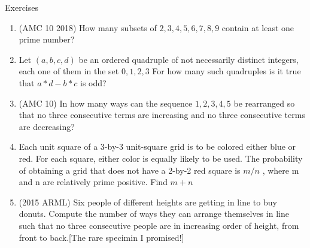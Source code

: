 \begin{xcb}{Exercises}
\begin{enumerate}
\begin{hint}
\end{hint}
\item(AMC 10 2018)  How many subsets of ${2, 3, 4, 5, 6, 7, 8, 9}$ contain at least one prime number?
\item {} Let $(a, b, c, d)$ be an ordered quadruple of not necessarily distinct integers, each one of them in the set $0, 1, 2, 3$ For how many such quadruples is it true that $a*d -b*c$ is odd?
\item (AMC 10)  In how many ways can the sequence $1, 2, 3, 4, 5$ be rearranged so that no three consecutive terms are increasing and no three consecutive terms are decreasing?
\item {} Each unit square of a 3-by-3 unit-square grid is to be colored either blue or red. For each square, either color is equally likely to be used. The probability of obtaining a grid that does not have a 2-by-2 red square is $m/n$ , where m and n are relatively prime positive. Find $m+n$
\begin{hint}
\end{hint}
\item     {} (2015 ARML) Six people of different heights are getting in line to buy donuts. Compute the number of ways they can arrange themselves in line such that no three consecutive people are in increasing order of height, from front to back.[The rare specimin I promised!]
\begin{hint}
\end{hint}
\end{enumerate}
\end{xcb}
